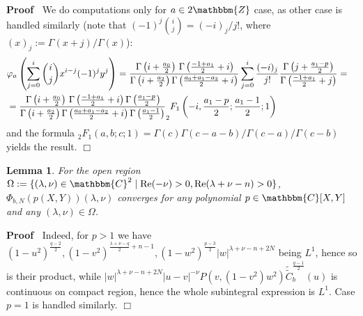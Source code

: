 \documentclass{article}
\newcommand{\assign}{:=}
\newcommand{\tmop}[1]{\ensuremath{\operatorname{#1}}}
\renewenvironment{proof}{\noindent\textbf{Proof\ }}{\hspace*{\fill}$\Box$\medskip}
\newtheorem{lemma}[proposition]{Lemma}
\theoremstyle{remark}
\begin{document}
\begin{proof}
  We do computations only for $a \in 2\mathbbm{Z}$ case, as other case is
  handled similarly (note that $(- 1)^j \binom{i}{j} = (- i)_j / j!$, where
  $(x)_j \assign \Gamma (x + j) / \Gamma (x)$):
  \begin{eqnarray}
    & \varphi_a \left( \sum_{j = 0}^i \binom{i}{j} x^{i - j} (- 1)^j y^j
    \right) = \frac{\hspace{0.17em} \Gamma \left( i + \frac{a_0}{2} \right) 
    \hspace{0.17em} \Gamma \left( \frac{- 1 + a_1}{2} + i \right)}{\Gamma
    \left( i + \frac{a_2}{2} \right) \Gamma \left( \frac{a_0 + a_1 - a_2}{2} +
    i \right)} \sum_{j = 0}^i \frac{(- i)_j}{j!} \frac{\Gamma \left( j +
    \frac{a_1 - p}{2} \right) }{\Gamma \left( \frac{- 1 + a_1}{2} + j \right)}
    = &  \nonumber\\
    & = \frac{\hspace{0.17em} \Gamma \left( i + \frac{a_0}{2} \right) 
    \hspace{0.17em} \Gamma \left( \frac{- 1 + a_1}{2} + i \right) \Gamma
    \left( \frac{a_1 - p}{2} \right)}{\Gamma \left( i + \frac{a_2}{2} \right)
    \Gamma \left( \frac{a_0 + a_1 - a_2}{2} + i \right) \Gamma \left(
    \frac{a_1 - 1}{2} \right)} _2 F_1 \left( - i, \frac{a_1 - p}{2} ;
    \frac{a_1 - 1}{2} ; 1 \right) &  \nonumber
  \end{eqnarray}
  and the formula $_2 F_1 (a, b ; c ; 1) = \Gamma (c) \Gamma (c - a - b) /
  \Gamma (c - a) / \Gamma (c - b)$ yields the result.
\end{proof}

\begin{lemma}
  \label{images:lem-Psi-convergence}For the open region $\Omega \assign \{
  (\lambda, \nu) \in \mathbbm{C}^2 \mid \tmop{Re} (- \nu) > 0, \tmop{Re}
  (\lambda + \nu - n) > 0 \}$, $\Phi_{b, N} (p (X, Y)) (\lambda, \nu)$
  converges for any polynomial $p \in \mathbbm{C} [X, Y]$ and any $(\lambda,
  \nu) \in \Omega$.
\end{lemma}

\begin{proof}
  Indeed, for $p > 1$ we have $(1 - u^2)^{\frac{q - 2}{2}}, (1 -
  v^2)^{\frac{\lambda + \nu - q}{2} + n - 1}, (1 - w^2)^{\frac{p - 3}{2}} | w
  |^{\lambda + \nu - n + 2 N}$ being $L^1$, hence so is their product, while
  $| w |^{\lambda + \nu - n + 2 N} | u - v |^{- \nu} P (v, (1 - v^2) w^2)
  \widetilde{\tilde{C}}^{\frac{q - 1}{2}}_b (u)$ is continuous on compact
  region, hence the whole subintegral expression is $L^1$. Case $p = 1$ is
  handled similarly.
\end{proof}
\end{document}
